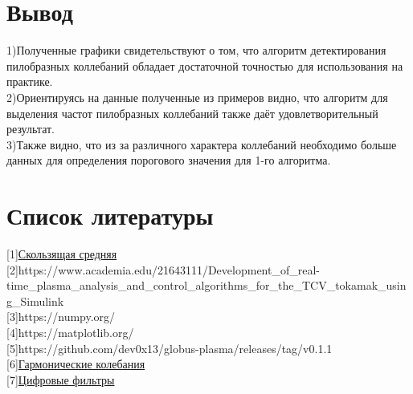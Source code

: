 \documentclass[a4]{article}
\begin{document}
	\section{Вывод}
		1)Полученные графики свидетельствуют о том, что алгоритм детектирования пилобразных коллебаний обладает достаточной точностью для использования на практике.\\
		
		2)Ориентируясь на данные полученные из примеров видно, что алгоритм для выделения частот пилобразных коллебаний также даёт удовлетворительный результат.\\
		
		3)Также видно, что из за различного характера коллебаний необходимо больше данных для определения порогового значения для 1-го алгоритма.
		\newpage
	\section{Список литературы}
	[1]\href{https://ru.wikipedia.org/wiki/%D0%A1%D0%BA%D0%BE%D0%BB%D1%8C%D0%B7%D1%8F%D1%89%D0%B0%D1%8F_%D1%81%D1%80%D0%B5%D0%B4%D0%BD%D1%8F%D1%8F#%D0%9F%D1%80%D0%BE%D1%81%D1%82%D0%BE%D0%B5_%D1%81%D0%BA%D0%BE%D0%BB%D1%8C%D0%B7%D1%8F%D1%89%D0%B5%D0%B5_%D1%81%D1%80%D0%B5%D0%B4%D0%BD%D0%B5%D0%B5}{Скользящая средняя} \\
	
	[2]https://www.academia.edu/21643111/Development\_of\_real-time\_plasma\_analysis\_and\_control\_algorithms\_for\_the\_TCV\_tokamak\_using\_Simulink\\
	
	[3]https://numpy.org/ \\
	
	[4]https://matplotlib.org/ \\
	
	[5]https://github.com/dev0x13/globus-plasma/releases/tag/v0.1.1 \\
	
	[6]\href{https://ru.wikipedia.org/wiki/%D0%93%D0%B0%D1%80%D0%BC%D0%BE%D0%BD%D0%B8%D1%87%D0%B5%D1%81%D0%BA%D0%B8%D0%B5_%D0%BA%D0%BE%D0%BB%D0%B5%D0%B1%D0%B0%D0%BD%D0%B8%D1%8F}{Гармонические колебания} \\

	[7]\href{https://cmi.to/%D1%84%D0%B8%D0%BB%D1%8C%D1%82%D1%80%D1%8B/}{Цифровые фильтры}
\end{document}
